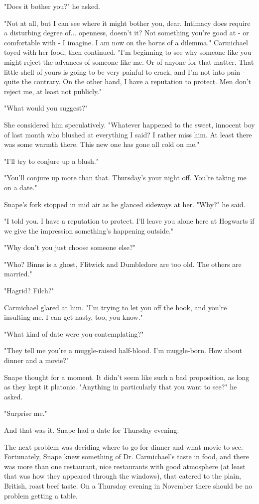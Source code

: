 \documentclass[a4paper,11pt]{article}
\begin{document}
"Does it bother you?" he asked.

"Not at all, but I can see where it might bother you, dear. Intimacy does require a disturbing degree of... openness, doesn't it? Not something you're good at - or comfortable with - I imagine. I am now on the horns of a dilemma." Carmichael toyed with her food, then continued. "I'm beginning to see why someone like you might reject the advances of someone like me. Or of anyone for that matter. That little shell of yours is going to be very painful to crack, and I'm not into pain - quite the contrary. On the other hand, I have a reputation to protect. Men don't reject me, at least not publicly."

"What would you suggest?"

She considered him speculatively. "Whatever happened to the sweet, innocent boy of last month who blushed at everything I said? I rather miss him. At least there was some warmth there. This new one has gone all cold on me."

"I'll try to conjure up a blush."

"You'll conjure up more than that. Thursday's your night off. You're taking me on a date."

Snape's fork stopped in mid air as he glanced sideways at her. "Why?" he said.

"I told you. I have a reputation to protect. I'll leave you alone here at Hogwarts if we give the impression something's happening outside."

"Why don't you just choose someone else?"

"Who? Binns is a ghost, Flitwick and Dumbledore are too old. The others are married."

"Hagrid? Filch?"

Carmichael glared at him. "I'm trying to let you off the hook, and you're insulting me. I can get nasty, too, you know."

"What kind of date were you contemplating?"

"They tell me you're a muggle-raised half-blood. I'm muggle-born. How about dinner and a movie?"

Snape thought for a moment. It didn't seem like such a bad proposition, as long as they kept it platonic. "Anything in particularly that you want to see?" he asked.

"Surprise me."

And that was it. Snape had a date for Thursday evening.

The next problem was deciding where to go for dinner and what movie to see. Fortunately, Snape knew something of Dr. Carmichael's taste in food, and there was more than one restaurant, nice restaurants with good atmosphere (at least that was how they appeared through the windows), that catered to the plain, British, roast beef taste. On a Thursday evening in November there should be no problem getting a table.
\end{document}
